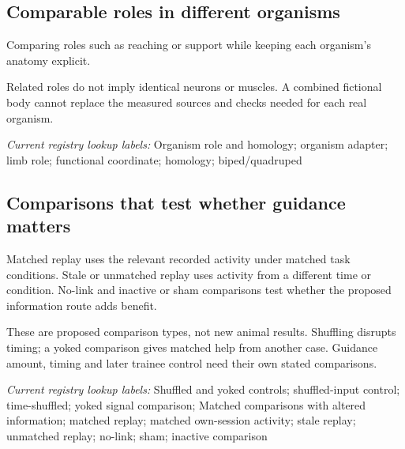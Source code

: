 \begin{samepage}
\subsection*{Comparable roles in different organisms}
\noindent Comparing roles such as reaching or support while keeping each organism’s anatomy explicit.\par
\end{samepage}
\begin{samepage}
\noindent Related roles do not imply identical neurons or muscles. A combined fictional body cannot replace the measured sources and checks needed for each real organism.\par\nopagebreak[4]

\end{samepage}


\noindent\textit{Current registry lookup labels:} Organism role and homology; organism adapter; limb role; functional coordinate; homology; biped/quadruped\par

\subsection*{Comparisons that test whether guidance matters}
\noindent Matched replay uses the relevant recorded activity under matched task conditions. Stale or unmatched replay uses activity from a different time or condition. No-link and inactive or sham comparisons test whether the proposed information route adds benefit.\par
\noindent These are proposed comparison types, not new animal results. Shuffling disrupts timing; a yoked comparison gives matched help from another case. Guidance amount, timing and later trainee control need their own stated comparisons.\par

\noindent\textit{Current registry lookup labels:} Shuffled and yoked controls; shuffled-input control; time-shuffled; yoked signal comparison; Matched comparisons with altered information; matched replay; matched own-session activity; stale replay; unmatched replay; no-link; sham; inactive comparison\par

